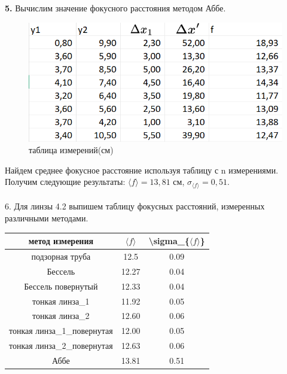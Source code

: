 \documentclass[a4paper,12pt]{article}
\begin{document}
\textbf{5.} Вычислим значение фокусного расстояния методом Аббе.
\begin{figure}[H]
    \centering
    \includegraphics[scale=0.6]{таблица.png}
    \caption{таблица измерений(см)}
\end{figure}
Найдем среднее фокусное расстояние используя таблицу с n измерениями. Получим следующие результаты: $\langle f \rangle = 13,81$ см, $\sigma_{\langle f \rangle} = 0,51$.\\
\\
6. Для линзы 4.2 выпишем таблицу фокусных расстояний, измеренных различными методами.
\begin{table}[h!]
\centering
\begin{tabular}{|cl|c|c|}

\hline
\multicolumn{2}{|c|}{метод измерения}             & $\langle f \rangle$ & \textbackslash{}sigma\_\{$\langle f \rangle$\} \\ \hline
\multicolumn{2}{|c|}{подзорная труба}             & 12.5              & 0.09                                           \\ \hline
\multicolumn{2}{|c|}{Бессель}                     & 12.27               & 0.04                                           \\ \hline
\multicolumn{2}{|c|}{Бессель повернутый}          & 12.33               & 0.04                                           \\ \hline
\multicolumn{2}{|c|}{тонкая линза\_1}             & 11.92               & 0.05                                           \\ \hline
\multicolumn{2}{|c|}{тонкая линза\_2}             & 12.60               & 0.06                                           \\ \hline
\multicolumn{2}{|c|}{тонкая линза\_1\_повернутая} & 12.00               & 0.05                                           \\ \hline
\multicolumn{2}{|c|}{тонкая линза\_2\_повернутая} & 12.63               & 0.06                                           \\ \hline
\multicolumn{2}{|c|}{Аббе}                        & 13.81               & 0.51                                           \\ \hline
\end{tabular}
\end{table}
\end{document}
